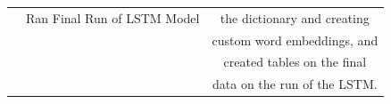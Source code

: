 \documentclass[11pt]{article}
\begin{document}
\begin{table}[H]
\begin{tabular}{c|c|c}
                                    & Ran Final Run of LSTM Model    & the dictionary and creating  \\
                                    &                                & custom word embeddings, and  \\
                                    &                                & created tables on the final  \\
                                    &                                & data on the run of the LSTM. \\
        \hline
    \end{tabular}
    \label{tab:my_label}
\end{table}




\end{document}
